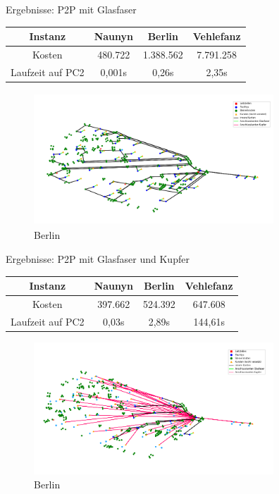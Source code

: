 \documentclass{beamer}
\begin{document}
	\begin{frame}{Ergebnisse: P2P mit Glasfaser}
	\begin{table}[h]
		\centering
		\begin{tabular}{c|c|c|c}
			Instanz & Naunyn & Berlin & Vehlefanz \\	
			\hline
			Kosten & 480.722 & 1.388.562 & 7.791.258 \\
			Laufzeit auf PC2 & 0,001s & 0,26s & 2,35s\\
		\end{tabular}
	\end{table} 
	\begin{figure}
		\centering
		\includegraphics[height=5cm, width=9cm]{./Bilder/P2PG_Berlin} 
		\caption{Berlin}
	\end{figure}
	\end{frame}
	
	\begin{frame}{Ergebnisse: P2P mit Glasfaser und Kupfer}
\begin{table}[h]
	\centering
	\begin{tabular}{c|c|c|c}
		Instanz & Naunyn & Berlin & Vehlefanz \\	
		\hline
		Kosten & 397.662 & 524.392 & 647.608 \\
		Laufzeit auf PC2 & 0,03s & 2,89s & 144,61s \\
	\end{tabular}
\end{table}
	\begin{figure}
			\centering
			\includegraphics[height=5cm, width=9cm]{./Bilder/P2PGK_Berlin_demand1_duration0} 
			\caption{Berlin}
			\end{figure}
		\end{frame}
	
\end{document}
